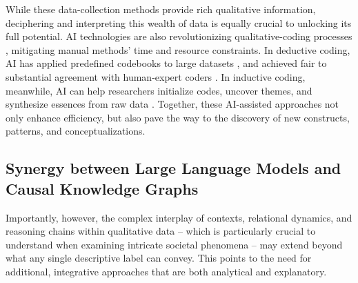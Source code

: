 While these data-collection methods provide rich qualitative information, deciphering and interpreting this wealth of data is equally crucial to unlocking its full potential. 
AI technologies are also revolutionizing qualitative-coding processes \cite{ai_qualitative_feuston_2021, ai_qualitative_muller_2016, ai_qualitative_rietz_2020}, mitigating manual methods' time and resource constraints. 
In deductive coding, AI has applied predefined codebooks to large datasets \cite{coding_deductive_llm_tai_2024, deductive_labelling_xiao_2023}, and achieved fair to substantial agreement with human-expert coders \cite{cohens_kappa_mchugh_2012, prompt_practice_dunivin_2024}. 
In inductive coding, meanwhile, AI can help researchers initialize codes, uncover themes, and synthesize essences from raw data \cite{content_analysis_coding_toolgpt_gao_2023}. 
Together, these AI-assisted approaches not only enhance efficiency, but also pave the way to the discovery of new constructs, patterns, and conceptualizations. 









\subsection{Synergy between Large Language Models and Causal Knowledge Graphs}

Importantly, however, the complex interplay of contexts, relational dynamics, and reasoning chains within qualitative data – which is particularly crucial to understand when examining intricate societal phenomena – may extend beyond what any single descriptive label can convey. 
This points to the need for additional, integrative approaches that are both analytical and explanatory.


